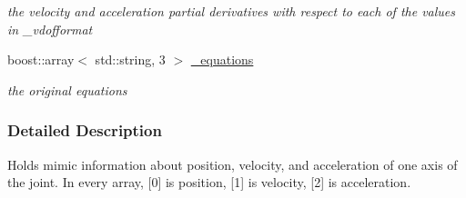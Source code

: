 \begin{DoxyCompactItemize}
\begin{DoxyCompactList}\small\item\em the velocity and acceleration partial derivatives with respect to each of the values in \_\-vdofformat \item\end{DoxyCompactList}\item 
\hypertarget{structOpenRAVE_1_1KinBody_1_1Joint_1_1MIMIC_aefb73aaff0cfa2065a5153ff0705796c}{
boost::array$<$ std::string, 3 $>$ \hyperlink{structOpenRAVE_1_1KinBody_1_1Joint_1_1MIMIC_aefb73aaff0cfa2065a5153ff0705796c}{\_\-equations}}
\label{structOpenRAVE_1_1KinBody_1_1Joint_1_1MIMIC_aefb73aaff0cfa2065a5153ff0705796c}

\begin{DoxyCompactList}\small\item\em the original equations \item\end{DoxyCompactList}\end{DoxyCompactItemize}


\subsubsection{Detailed Description}
Holds mimic information about position, velocity, and acceleration of one axis of the joint. In every array, \mbox{[}0\mbox{]} is position, \mbox{[}1\mbox{]} is velocity, \mbox{[}2\mbox{]} is acceleration. 